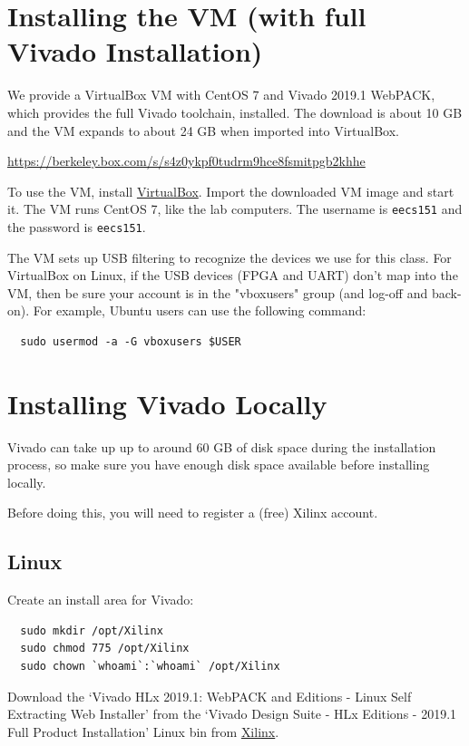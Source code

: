 \documentclass[11pt]{article}
\begin{document}
\newpage
\appendix
\appendixpage
\section{Installing the VM (with full Vivado Installation)}
\label{section:vm}
We provide a VirtualBox VM with CentOS 7 and Vivado 2019.1 WebPACK, which provides the full Vivado toolchain, installed. The download is about 10 GB and the VM expands to about 24 GB when imported into VirtualBox.

\url{https://berkeley.box.com/s/s4z0ykpf0tudrm9hce8fsmitpgb2khhe}

To use the VM, install \href{https://www.virtualbox.org/}{VirtualBox}. Import the downloaded VM image and start it. The VM runs CentOS 7, like the lab computers. The username is \texttt{eecs151} and the password is \texttt{eecs151}.

The VM sets up USB filtering to recognize the devices we use for this class. For VirtualBox on Linux, if the USB devices (FPGA and UART) don't map into the VM, then be sure your account is in the "vboxusers" group (and log-off and back-on). For example, Ubuntu users can use the following command:

\begin{verbatim}
  sudo usermod -a -G vboxusers $USER
\end{verbatim}

\section{Installing Vivado Locally}
\label{section:localvivado}

Vivado can take up up to around 60 GB of disk space during the installation process, so make sure you have enough disk space available before installing locally.

Before doing this, you will need to register a (free) Xilinx account.

\subsection{Linux}
Create an install area for Vivado:
\begin{verbatim}
  sudo mkdir /opt/Xilinx
  sudo chmod 775 /opt/Xilinx
  sudo chown `whoami`:`whoami` /opt/Xilinx
\end{verbatim}

Download the `Vivado HLx 2019.1: WebPACK and Editions - Linux Self Extracting Web Installer' from the `Vivado Design Suite - HLx Editions - 2019.1  Full Product Installation' Linux bin from \href{https://www.xilinx.com/support/download/index.html/content/xilinx/en/downloadNav/vivado-design-tools/archive.html}{Xilinx}.
\end{document}
